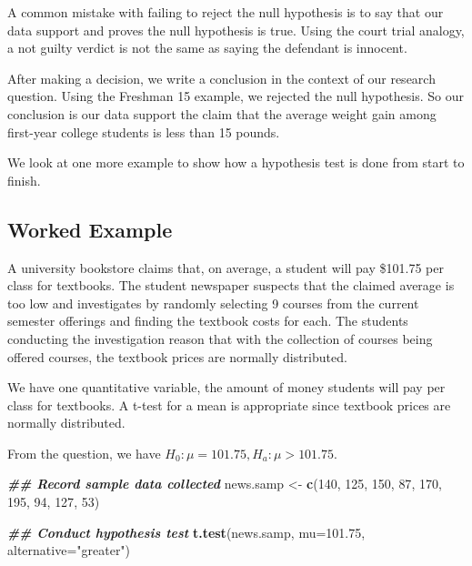 \documentclass[
]{book}
\newenvironment{Shaded}{\begin{snugshade}}{\end{snugshade}}
\newcommand{\AttributeTok}[1]{\textcolor[rgb]{0.13,0.29,0.53}{#1}}
\newcommand{\DecValTok}[1]{\textcolor[rgb]{0.00,0.00,0.81}{#1}}
\newcommand{\DocumentationTok}[1]{\textcolor[rgb]{0.56,0.35,0.01}{\textbf{\textit{#1}}}}
\newcommand{\FloatTok}[1]{\textcolor[rgb]{0.00,0.00,0.81}{#1}}
\newcommand{\FunctionTok}[1]{\textcolor[rgb]{0.13,0.29,0.53}{\textbf{#1}}}
\newcommand{\NormalTok}[1]{#1}
\newcommand{\OtherTok}[1]{\textcolor[rgb]{0.56,0.35,0.01}{#1}}
\newcommand{\StringTok}[1]{\textcolor[rgb]{0.31,0.60,0.02}{#1}}
\theoremstyle{definition}
\theoremstyle{definition}
\theoremstyle{definition}
\theoremstyle{definition}
\theoremstyle{remark}
\begin{document}
A common mistake with failing to reject the null hypothesis is to say that our data support and proves the null hypothesis is true. Using the court trial analogy, a not guilty verdict is not the same as saying the defendant is innocent.

After making a decision, we write a conclusion in the context of our research question. Using the Freshman 15 example, we rejected the null hypothesis. So our conclusion is our data support the claim that the average weight gain among first-year college students is less than 15 pounds.

We look at one more example to show how a hypothesis test is done from start to finish.

\hypertarget{eg1samplet}{%
\subsection{Worked Example}\label{eg1samplet}}

A university bookstore claims that, on average, a student will pay \$101.75 per class for textbooks. The student newspaper suspects that the claimed average is too low and investigates by randomly selecting 9 courses from the current semester offerings and finding the textbook costs for each. The students conducting the investigation reason that with the collection of courses being offered courses, the textbook prices are normally distributed.

We have one quantitative variable, the amount of money students will pay per class for textbooks. A t-test for a mean is appropriate since textbook prices are normally distributed.

From the question, we have \(H_0: \mu = 101.75, H_a: \mu > 101.75\).

\begin{Shaded}
\begin{Highlighting}[]
\DocumentationTok{\#\# Record sample data collected}
\NormalTok{news.samp }\OtherTok{\textless{}{-}} \FunctionTok{c}\NormalTok{(}\DecValTok{140}\NormalTok{, }\DecValTok{125}\NormalTok{, }\DecValTok{150}\NormalTok{, }\DecValTok{87}\NormalTok{, }\DecValTok{170}\NormalTok{, }\DecValTok{195}\NormalTok{, }\DecValTok{94}\NormalTok{, }\DecValTok{127}\NormalTok{, }\DecValTok{53}\NormalTok{)}

\DocumentationTok{\#\# Conduct hypothesis test}
\FunctionTok{t.test}\NormalTok{(news.samp, }\AttributeTok{mu=}\FloatTok{101.75}\NormalTok{, }\AttributeTok{alternative=}\StringTok{"greater"}\NormalTok{)}
\end{Highlighting}
\end{Shaded}
\end{document}
